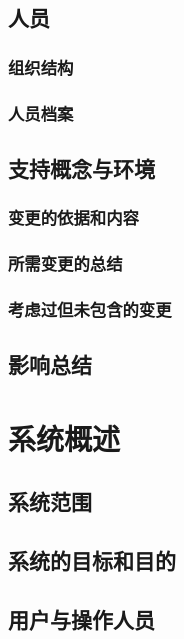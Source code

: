 \documentclass{ctexart}
\begin{document}
\subsection{人员}

\subsubsection{组织结构}

\subsubsection{人员档案}

\subsection{支持概念与环境}

\subsubsection{变更的依据和内容}

\subsubsection{所需变更的总结}

\subsubsection{考虑过但未包含的变更}

\subsection{影响总结}

\newpage
\section{系统概述}

\subsection{系统范围}

\subsection{系统的目标和目的}

\subsection{用户与操作人员}
\end{document}
